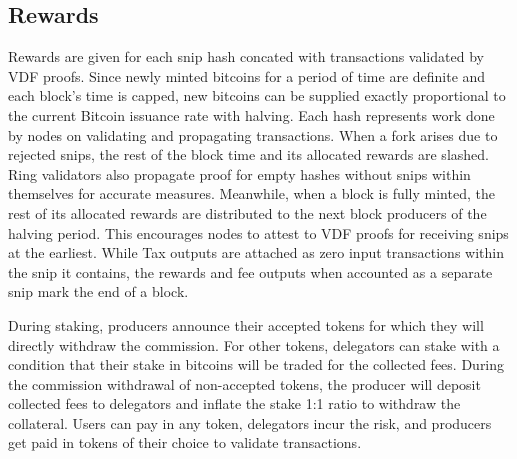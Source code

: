 \documentclass[../Bitcoin Blink.tex]{subfiles}
\begin{document}
\subsection{Rewards}
Rewards are given for each snip hash concated with transactions validated by VDF proofs. Since newly minted bitcoins for a period of time are definite and each block's time is capped, new bitcoins can be supplied exactly proportional to the current Bitcoin issuance rate with halving. Each hash represents work done by nodes on validating and propagating transactions. When a fork arises due to rejected snips, the rest of the block time and its allocated rewards are slashed. Ring validators also propagate proof for empty hashes without snips within themselves for accurate measures. Meanwhile, when a block is fully minted, the rest of its allocated rewards are distributed to the next block producers of the halving period. This encourages nodes to attest to VDF proofs for receiving snips at the earliest. While Tax outputs are attached as zero input transactions within the snip it contains, the rewards and fee outputs when accounted as a separate snip mark the end of a block. 

During staking, producers announce their accepted tokens for which they will directly withdraw the commission. For other tokens, delegators can stake with a condition that their stake in bitcoins will be traded for the collected fees. During the commission withdrawal of non-accepted tokens, the producer will deposit collected fees to delegators and inflate the stake 1:1 ratio to withdraw the collateral. Users can pay in any token, delegators incur the risk, and producers get paid in tokens of their choice to validate transactions.
\end{document}
